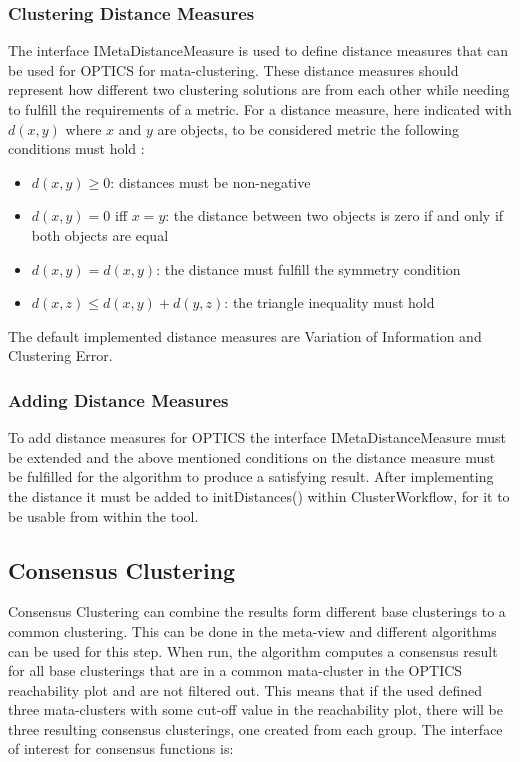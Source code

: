 \documentclass[
	a4paper,
	english,
	twoside,
	openright,               
	11pt                            
	]{report}
\begin{document}
\subsubsection{Clustering Distance Measures}
The interface IMetaDistanceMeasure is used to define distance measures that can be used for OPTICS for mata-clustering. These distance measures should represent how different two clustering solutions are from each other while needing to fulfill the requirements of a metric. For a distance measure, here indicated with $d(x,y)$ where $x$ and $y$ are objects, to be considered metric the following conditions must hold \cite{10.5555/1756006.1953024}:
\begin{itemize}
  \item $d(x,y)\geq0$: distances must be non-negative
  \item $d(x,y)=0$ iff $x=y$: the distance between two objects is zero if and only if both objects are equal
  \item $d(x,y)=d(x,y)$: the distance must fulfill the symmetry condition
  \item $d(x,z)\leq d(x,y)+d(y,z)$: the triangle inequality must hold
\end{itemize}

The default implemented distance measures are Variation of Information and Clustering Error. 
\subsubsection*{Adding Distance Measures}
To add distance measures for OPTICS the interface IMetaDistanceMeasure must be extended and the above mentioned conditions on the distance measure must be fulfilled for the algorithm to produce a satisfying result. After implementing the distance it must be added to initDistances() within ClusterWorkflow, for it to be usable from within the tool.

\subsection{Consensus Clustering}
Consensus Clustering can combine the results form different base clusterings to a common clustering. This can be done in the meta-view and different algorithms can be used for this step. When run, the algorithm computes a consensus result for all base clusterings that are in a common mata-cluster in the OPTICS reachability plot and are not filtered out. This means that if the used defined three mata-clusters with some cut-off value in the reachability plot, there will be three resulting consensus clusterings, one created from each group. The interface of interest for consensus functions is:
\end{document}
